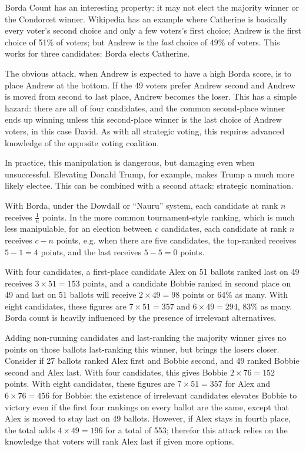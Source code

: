 Borda Count has an interesting property:  it may not elect the majority winner or the Condorcet winner.  Wikipedia has an example where Catherine is basically every voter's second choice and only a few voters's first choice; Andrew is the first choice of 51\% of voters; but Andrew is the \textit{last} choice of 49\% of voters.  This works for three candidates:  Borda elects Catherine.

The obvious attack, when Andrew is expected to have a high Borda score, is to place Andrew at the bottom.  If the 49 voters prefer Andrew second and Andrew is moved from second to last place, Andrew becomes the loser.  This has a simple hazard:  there are all of four candidates, and the common second-place winner ends up winning unless this second-place winner is the last choice of Andrew voters, in this case David.  As with all strategic voting, this requires advanced knowledge of the opposite voting coalition.

In practice, this manipulation is dangerous, but damaging even when unsuccessful.  Elevating Donald Trump, for example, makes Trump a much more likely electee.  This can be combined with a second attack:  strategic nomination.

With Borda, under the Dowdall or ``Nauru'' system, each candidate at rank $n$ receives $\frac{1}{n}$ points.  In the more common tournament-style ranking, which is much less manipulable, for an election between $c$ candidates, each candidate at rank $n$ receives $c-n$ points, e.g. when there are five candidates, the top-ranked receives $5-1=4$ points, and the last receives $5-5=0$ points.

With four candidates, a first-place candidate Alex on 51 ballots ranked last on 49 receives $3\times51=153$ points, and a candidate Bobbie ranked in second place on 49 and last on 51 ballots will receive $2\times49=98$ points or 64\% as many.  With eight candidates, these figures are $7\times51=357$ and $6\times49=294$, 83\% as many.  Borda count is heavily influenced by the presence of irrelevant alternatives.

Adding non-running candidates and last-ranking the majority winner gives no points on those ballots last-ranking this winner, but brings the losers closer.  Consider if 27 ballots ranked Alex first and Bobbie second, and 49 ranked Bobbie second and Alex last.  With four candidates, this gives Bobbie $2\times76=152$ points.  With eight candidates, these figures are $7\times51=357$ for Alex and $6\times76=456$ for Bobbie:  the existence of irrelevant candidates elevates Bobbie to victory even if the first four rankings on every ballot are the same, except that Alex is moved to stay last on 49 ballots.  However, if Alex stays in fourth place, the total adds $4\times49=196$ for a total of 553; therefor this attack relies on the knowledge that voters will rank Alex last if given more options.

